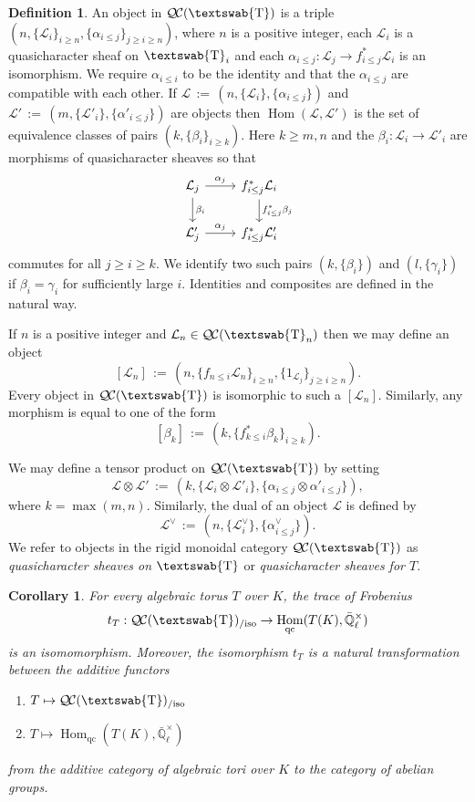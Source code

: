 \documentclass{amsart}
\theoremstyle{plain}
\newtheorem{corollary}[theorem]{Corollary}
\theoremstyle{definition}
\newtheorem{definition}[theorem]{Definition}
\theoremstyle{remark}
\newcommand{\EE}{\mathbb{\bar Q}_\ell}
\newcommand{\EEx}{\EE^\times}
\newcommand{\mathswab}[1]{\operatorname{\textswab{#1}}}
\newcommand{\GN}[1]{\mathswab{#1}}
\DeclareMathOperator{\Hom}{Hom}
\newcommand{\ceq}{{\, :=\, }}
\newcommand{\qcs}[1]{{\mathcal{#1}}}
\newcommand{\QC}{{\mathcal{Q\hskip-0.8pt C}}}
\newcommand{\QCiso}[1]{\QC(#1)_{/\text{iso}}}
\newcommand{\trFrob}[1]{t_{#1}}
\begin{document}
\begin{definition}\label{def:catGN}
An object in $\QC(\GN{T})$ is a triple $(n, \{\qcs{L}_i\}_{i \ge n}, \{\alpha_{i \le j}\}_{j \ge i \ge n})$, where $n$
is a positive integer, each $\qcs{L}_i$ is a quasicharacter sheaf on $\GN{T}_i$ and each
$\alpha_{i \le j} : \qcs{L}_j \to f^*_{i \le j} \qcs{L}_i$ is an isomorphism.  We require $\alpha_{i \le i}$ to be
the identity and that the $\alpha_{i \le j}$ are compatible with each other.  If $\qcs{L} \ceq (n, \{\qcs{L}_i\}, \{\alpha_{i \le j}\})$
and $\qcs{L}' \ceq (m, \{\qcs{L}'_i\}, \{\alpha'_{i \le j}\})$ are objects then $\Hom(\qcs{L}, \qcs{L}')$ is the set
of equivalence classes of pairs $(k, \{\beta_i\}_{i \ge k})$.  Here $k \ge m, n$ and the $\beta_i : \qcs{L}_i \to \qcs{L}'_i$ are
morphisms of quasicharacter sheaves so that
\[
\begin{tikzcd}
\qcs{L}_j \rar{\alpha_j} \dar{\beta_i} & f^*_{i \le j} \qcs{L}_i \dar{f_{i \le j}^*\beta_j} \\
\qcs{L}'_j \rar{\alpha_j} & f^*_{i \le j} \qcs{L}'_i
\end{tikzcd}
\]
commutes for all $j \ge i \ge k$.  We identify two such pairs $(k, \{\beta_i\})$ and $(l, \{\gamma_i\})$ if $\beta_i = \gamma_i$
for sufficiently large $i$.  Identities and composites are defined in the natural way.

If $n$ is a positive integer and $\qcs{L}_n \in \QC(\GN{T}_n)$ then we may define an object
\[
[\qcs{L}_n] \ceq (n, \{f_{n \le i} \qcs{L}_n\}_{i \ge n}, \{1_{\qcs{L}_j}\}_{j \ge i \ge n}).
\]
Every object in $\QC(\GN{T})$ is isomorphic to such a $[\qcs{L}_n]$.  Similarly, any morphism is equal to one of the form
\[
[\beta_k] \ceq (k, \{f_{k \le i}^* \beta_k\}_{i \ge k}).
\]

We may define a tensor product on $\QC(\GN{T})$ by setting
\[
 \qcs{L} \otimes \qcs{L}' \ceq (k, \{\qcs{L}_i \otimes \qcs{L}'_i\}, \{\alpha_{i \le j} \otimes \alpha'_{i \le j}\}),
\]
where $k = \max(m, n)$.
Similarly, the dual of an object $\qcs{L}$ is defined by
\[
\qcs{L}^\vee \ceq (n, \{\qcs{L}_i^\vee\}, \{ \alpha_{i \le j}^\vee \}).
\]
We refer to objects in the rigid monoidal category
$\QC(\GN{T})$ as \emph{quasicharacter sheaves on $\GN{T}$}
or \emph{quasicharacter sheaves for $T$}.
\end{definition}

\begin{corollary}\label{cor:application}
For every algebraic torus $T$ over $K$, the trace of Frobenius
  \[
\trFrob{T}:  \QCiso{\GN{T}} \to \Hom_{\text{qc}}(T(K),\EEx)
  \]
is an isomomorphism.
Moreover, the isomorphism $\trFrob{T}$ is a natural transformation
between the additive functors
\begin{enumerate}
\item[$F_{\QC}$:] $T \mapsto \QCiso{\GN{T}}$
\item[$F_{\text{qc}}$:] $T \mapsto \Hom_{\text{qc}}(T(K),\EEx)$
\end{enumerate}
from the additive category of algebraic tori over $K$ to the category of abelian groups.
\end{corollary}
\end{document}

